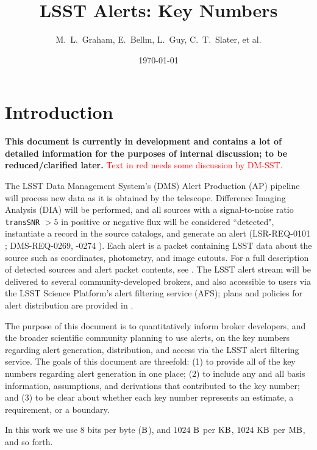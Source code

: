 \documentclass[DM,authoryear,toc]{lsstdoc}
\title[Alerts Key Numbers]{LSST Alerts: Key Numbers}
\author{%
M.~L.~Graham, E.~Bellm, L.~Guy, C.~T.~Slater, et al.
}
\date{\today}
\begin{document}
\maketitle

\section{Introduction} \label{sec:intro}

{\bf This document is currently in development and contains a lot of detailed information for the purposes of internal discussion; to be reduced/clarified later.} \textcolor{red}{Text in red needs some discussion by DM-SST.}

The LSST Data Management System's (DMS) Alert Production (AP) pipeline will process new data as it is obtained by the telescope. Difference Imaging Analysis (DIA) will be performed, and all sources with a signal-to-noise ratio {\tt transSNR} $>5$ in positive or negative flux will be considered ``detected", instantiate a record in the source catalogs, and generate an alert (LSR-REQ-0101 ; DMS-REQ-0269, -0274 ). Each alert is a packet containing LSST data about the source such as coordinates, photometry, and image cutouts. For a full description of detected sources and alert packet contents, see . The LSST alert stream will be delivered to several community-developed brokers, and also accessible to users via the LSST Science Platform's alert filtering service (AFS); plans and policies for alert distribution are provided in . 

The purpose of this document is to quantitatively inform broker developers, and the broader scientific community planning to use alerts, on the key numbers regarding alert generation, distribution, and access via the LSST alert filtering service. The goals of this document are threefold: (1) to provide all of the key numbers regarding alert generation in one place; (2) to include any and all basis information, assumptions, and derivations that contributed to the key number; and (3) to be clear about whether each key number represents an estimate, a requirement, or a boundary. 

In this work we use 8 bits per byte ($\rm B$), and $1024$ $\rm B$ per $\rm KB$, $1024$ $\rm KB$ per $\rm MB$, and so forth.
\end{document}

